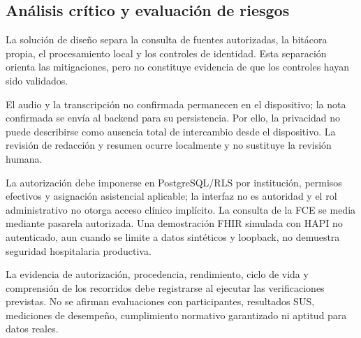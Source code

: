 \subsection{Análisis crítico y evaluación de riesgos}

La solución de diseño separa la consulta de fuentes autorizadas, la bitácora propia, el procesamiento local y los controles de identidad. Esta separación orienta las mitigaciones, pero no constituye evidencia de que los controles hayan sido validados.

El audio y la transcripción no confirmada permanecen en el dispositivo; la nota confirmada se envía al backend para su persistencia. Por ello, la privacidad no puede describirse como ausencia total de intercambio desde el dispositivo. La revisión de redacción y resumen ocurre localmente y no sustituye la revisión humana.

La autorización debe imponerse en PostgreSQL/RLS por institución, permisos efectivos y asignación asistencial aplicable; la interfaz no es autoridad y el rol administrativo no otorga acceso clínico implícito. La consulta de la FCE se media mediante pasarela autorizada. Una demostración FHIR simulada con HAPI no autenticado, aun cuando se limite a datos sintéticos y loopback, no demuestra seguridad hospitalaria productiva.

La evidencia de autorización, procedencia, rendimiento, ciclo de vida y comprensión de los recorridos debe registrarse al ejecutar las verificaciones previstas. No se afirman evaluaciones con participantes, resultados SUS, mediciones de desempeño, cumplimiento normativo garantizado ni aptitud para datos reales.

